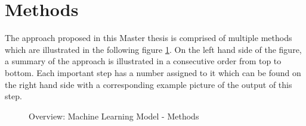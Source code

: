 \section{Methods}	

The approach proposed in this Master thesis is comprised of multiple methods which are illustrated in the following figure \ref{fig:MachineLearningModelMethods}. On the left hand side of the figure, a summary of the approach is illustrated in a consecutive order from top to bottom. Each important step has a number assigned to it which can be found on the right hand side with a corresponding example picture of the output of this step.

\begin{figure}[H]
  \begin{center}
  \caption{Overview: Machine Learning Model - Methods}
  \label{fig:MachineLearningModelMethods}
  \end{center}
\end{figure}




